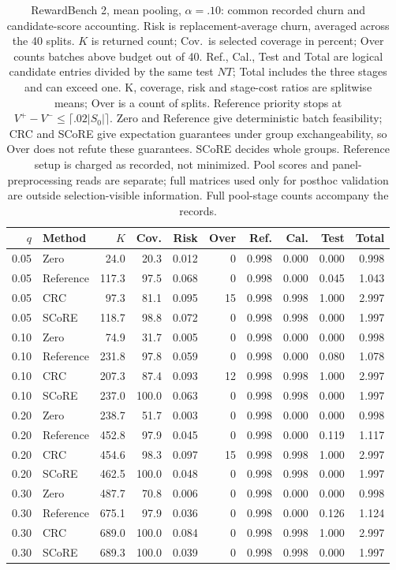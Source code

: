 \begin{table}[t]
\centering\small
\setlength{\tabcolsep}{4pt}
\begin{tabular}{rlrrrrrrrr}
\toprule
$q$ & Method & $K$ & Cov. & Risk & Over & Ref. & Cal. & Test & Total \\
\midrule
0.05 & Zero & 24.0 & 20.3 & 0.012 & 0 & 0.998 & 0.000 & 0.000 & 0.998 \\
0.05 & Reference & 117.3 & 97.5 & 0.068 & 0 & 0.998 & 0.000 & 0.045 & 1.043 \\
0.05 & CRC & 97.3 & 81.1 & 0.095 & 15 & 0.998 & 0.998 & 1.000 & 2.997 \\
0.05 & SCoRE & 118.7 & 98.8 & 0.072 & 0 & 0.998 & 0.998 & 0.000 & 1.997 \\
0.10 & Zero & 74.9 & 31.7 & 0.005 & 0 & 0.998 & 0.000 & 0.000 & 0.998 \\
0.10 & Reference & 231.8 & 97.8 & 0.059 & 0 & 0.998 & 0.000 & 0.080 & 1.078 \\
0.10 & CRC & 207.3 & 87.4 & 0.093 & 12 & 0.998 & 0.998 & 1.000 & 2.997 \\
0.10 & SCoRE & 237.0 & 100.0 & 0.063 & 0 & 0.998 & 0.998 & 0.000 & 1.997 \\
0.20 & Zero & 238.7 & 51.7 & 0.003 & 0 & 0.998 & 0.000 & 0.000 & 0.998 \\
0.20 & Reference & 452.8 & 97.9 & 0.045 & 0 & 0.998 & 0.000 & 0.119 & 1.117 \\
0.20 & CRC & 454.6 & 98.3 & 0.097 & 15 & 0.998 & 0.998 & 1.000 & 2.997 \\
0.20 & SCoRE & 462.5 & 100.0 & 0.048 & 0 & 0.998 & 0.998 & 0.000 & 1.997 \\
0.30 & Zero & 487.7 & 70.8 & 0.006 & 0 & 0.998 & 0.000 & 0.000 & 0.998 \\
0.30 & Reference & 675.1 & 97.9 & 0.036 & 0 & 0.998 & 0.000 & 0.126 & 1.124 \\
0.30 & CRC & 689.0 & 100.0 & 0.084 & 0 & 0.998 & 0.998 & 1.000 & 2.997 \\
0.30 & SCoRE & 689.3 & 100.0 & 0.039 & 0 & 0.998 & 0.998 & 0.000 & 1.997 \\
\bottomrule
\end{tabular}
\caption{RewardBench 2, mean pooling, $\alpha=.10$: common recorded churn and candidate-score accounting. Risk is replacement-average churn, averaged across the 40 splits. $K$ is returned count; Cov.\ is selected coverage in percent; Over counts batches above budget out of 40. Ref., Cal., Test and Total are logical candidate entries divided by the same test $NT$; Total includes the three stages and can exceed one. K, coverage, risk and stage-cost ratios are splitwise means; Over is a count of splits. Reference priority stops at $V^+-V^-\le\lceil.02|S_0|\rceil$. Zero and Reference give deterministic batch feasibility; CRC and SCoRE give expectation guarantees under group exchangeability, so Over does not refute these guarantees. SCoRE decides whole groups. Reference setup is charged as recorded, not minimized. Pool scores and panel-preprocessing reads are separate; full matrices used only for posthoc validation are outside selection-visible information. Full pool-stage counts accompany the records.}
\label{tab:common-RewardBench2-mean}
\end{table}
